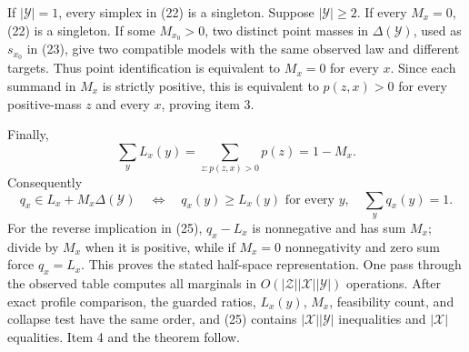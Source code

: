 If \(|\mathcal Y|=1\), every simplex in (22) is a singleton.  Suppose
\(|\mathcal Y|\geq2\).  If every \(M_x=0\), (22) is a singleton.  If
some \(M_{x_0}>0\), two distinct point masses in
\(\Delta(\mathcal Y)\), used as \(s_{x_0}\) in (23), give two compatible
models with the same observed law and different targets.  Thus point
identification is equivalent to \(M_x=0\) for every \(x\).  Since each
summand in \(M_x\) is strictly positive, this is equivalent to
\(p(z,x)>0\) for every positive-mass \(z\) and every \(x\), proving item
3.

Finally,
\[
 \sum_yL_x(y)=\sum_{z:p(z,x)>0}p(z)=1-M_x.
\tag{24}
\]
Consequently
\[
 q_x\in L_x+M_x\Delta(\mathcal Y)
 \quad\Longleftrightarrow\quad
 q_x(y)\geq L_x(y)\text{ for every }y,
 \quad \sum_yq_x(y)=1.
\tag{25}
\]
For the reverse implication in (25), \(q_x-L_x\) is nonnegative and has
sum \(M_x\); divide by \(M_x\) when it is positive, while if \(M_x=0\)
nonnegativity and zero sum force \(q_x=L_x\).  This proves the stated
half-space representation.  One pass through the observed table computes
all marginals in
\(O(|\mathcal Z||\mathcal X||\mathcal Y|)\) operations.  After exact
profile comparison, the guarded ratios, \(L_x(y)\), \(M_x\), feasibility
count, and collapse test have the same order, and (25) contains
\(|\mathcal X||\mathcal Y|\) inequalities and \(|\mathcal X|\)
equalities.  Item 4 and the theorem follow.
